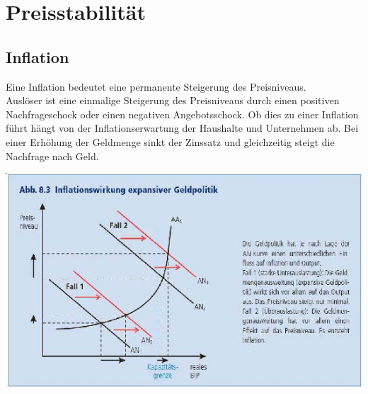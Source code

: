 \section{Preisstabilität}
\vspace{-0.5cm}
\begin{minipage}{0.5\linewidth}
    \subsection{Inflation}
    Eine Inflation bedeutet eine permanente Steigerung des Preisniveaus.\\
    Auslöser ist eine einmalige Steigerung des Preisniveaus durch einen positiven Nachfrageschock oder einen negativen Angebotsschock. Ob dies zu einer Inflation führt hängt von der Inflationserwartung der Haushalte und Unternehmen ab. Bei einer Erhöhung der Geldmenge sinkt der Zinssatz und gleichzeitig steigt die Nachfrage nach Geld. 
\end{minipage}
\begin{minipage}{0.5\linewidth}
    \includegraphics[width=\linewidth]{images/Inflationswirkung}
\end{minipage}
\vspace{-1cm}
